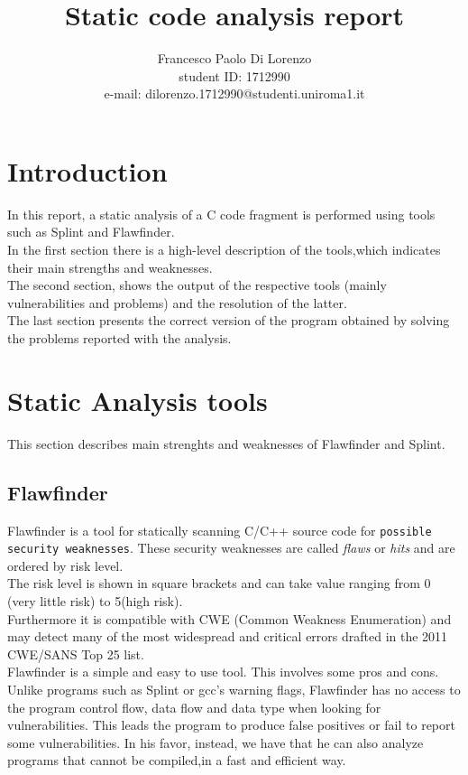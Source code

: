 \documentclass[a4paper,12pt]{article}
\begin{document}
%

   \title{Static code analysis report}

   \author{Francesco Paolo Di Lorenzo  \\ student ID: 1712990 \\ e-mail: dilorenzo.1712990@studenti.uniroma1.it}
          
   \date{}

   \maketitle
   

 
\tableofcontents
 


\section*{Introduction}
In this report, a static analysis of a C code fragment is performed using tools such as Splint and Flawfinder. \\
In the first section there is a high-level description of the tools,which indicates their main strengths and weaknesses. \\
The second section, shows the output of the respective tools (mainly vulnerabilities and problems) and the resolution of the latter.\\
The last section presents the correct version of the program obtained by solving the problems reported with the analysis.


\section{Static Analysis tools}
This section describes main strenghts and weaknesses of Flawfinder and Splint.
\subsection{Flawfinder}
Flawfinder is a tool for statically scanning C/C++ source code for \texttt{possible security weaknesses}. These security weaknesses are called \textit{flaws} or \textit{hits} and are ordered by risk level.\\
The risk level is shown in square brackets and can take value ranging from 0 (very little risk) to 5(high risk)\cite{flaw}.\\
Furthermore it is compatible with CWE (Common
Weakness Enumeration)\cite{flaw2}\cite{CWE} and may detect many of the most widespread and
critical errors drafted in the 2011 CWE/SANS Top 25 list.\\
Flawfinder is a simple and easy to use tool. This involves some pros and cons.\cite{flaw}\\
Unlike programs such as Splint or gcc's warning flags, Flawfinder has no access to the program control flow, data flow and data type when looking for vulnerabilities.
This leads the program to produce false positives or fail to report some vulnerabilities.
In his favor, instead, we have that he can also analyze programs that cannot be compiled,in a fast and efficient way.
\end{document}
